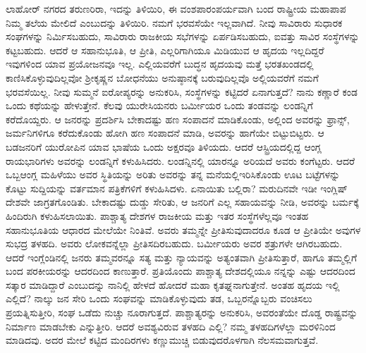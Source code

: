 ಲಾಹೋರ್​ ನಗರದ ತರುಣರಿರಾ, ಇದನ್ನು ತಿಳಿಯಿರಿ, ಈ ವಂಶ\break ಪಾರಂಪರ್ಯವಾಗಿ ಬಂದ ರಾಷ್ಟ್ರೀಯ ಮಹಾಪಾಪ ನಿಮ್ಮ ತಲೆಯ ಮೇಲಿದೆ ಎಂಬುದನ್ನು ತಿಳಿಯಿರಿ. ನಮಗೆ ಭರವಸೆಯೇ ಇಲ್ಲವಾಗಿದೆ. ನೀವು ಸಾವಿರಾರು ಸುಧಾರಕ ಸಂಘಗಳನ್ನು ನಿರ್ಮಿಸಬಹುದು, ಸಾವಿರಾರು ರಾಜಕೀಯ ಸಭೆಗಳನ್ನು ಏರ್ಪಡಿಸಬಹುದು, ಐವತ್ತು ಸಾವಿರ ಸಂಸ್ಥೆಗಳನ್ನು ಕಟ್ಟಬಹುದು. ಆದರೆ ಆ ಸಹಾನುಭೂತಿ, ಆ ಪ್ರೀತಿ, ಎಲ್ಲರಿಗಾಗಿಯೂ ಮಿಡಿಯುವ ಆ ಹೃದಯ ಇಲ್ಲದಿದ್ದರೆ ಇವುಗಳಿಂದ ಯಾವ ಪ್ರಯೋಜನವೂ ಇಲ್ಲ. ಎಲ್ಲಿಯವರೆಗೆ ಬುದ್ಧನ ಹೃದಯವು ಮತ್ತೆ ಭರತಖಂಡದಲ್ಲಿ ಕಾಣಿಸಿಕೊಳ್ಳುವುದಿಲ್ಲವೋ ಶ‍್ರೀಕೃಷ್ಣನ ಬೋಧನೆಯು ಅನುಷ್ಠಾನಕ್ಕೆ ಬರುವುದಿಲ್ಲವೊ ಅಲ್ಲಿಯವರೆಗೆ ನಮಗೆ ಭರವಸೆಯಿಲ್ಲ. ನೀವು ಸುಮ್ಮನೆ ಐರೋಪ್ಯರನ್ನು ಅನುಕರಿಸಿ, ಸಂಸ್ಥೆಗಳನ್ನು ಕಟ್ಟಿದರೆ ಏನಾಗುತ್ತದೆ? ನಾನು ಕಣ್ಣಾರೆ ಕಂಡ ಒಂದು ಕಥೆಯನ್ನು ಹೇಳುತ್ತೇನೆ. ಕೆಲವು ಯುರೇಸಿಯನರು ಬರ್ಮೀಯರ ಒಂದು ತಂಡವನ್ನು ಲಂಡನ್ನಿಗೆ ಕರೆದೊಯ್ದರು. ಆ ಜನರನ್ನು ಪ್ರದರ್ಶಿಸಿ ಬೇಕಾದಷ್ಟು ಹಣ ಸಂಪಾದನೆ ಮಾಡಿಕೊಂಡು, ಅಲ್ಲಿಂದ ಅವರನ್ನು ಫ್ರಾನ್ಸ್, ಜರ್ಮನಿಗಳಿಗೂ ಕರೆದುಕೊಂಡು ಹೋಗಿ ಹಣ ಸಂಪಾದನೆ ಮಾಡಿ, ಅವರನ್ನು ಹಾಗೆಯೇ ಬಿಟ್ಟುಬಿಟ್ಟರು. ಆ ಬಡಜನರಿಗೆ ಯುರೋಪಿನ ಯಾವ ಭಾಷೆಯ ಒಂದು ಅಕ್ಷರವೂ ತಿಳಿಯದು. ಆದರೆ ಆಸ್ಟ್ರಿಯದಲ್ಲಿದ್ದ ಆಂಗ್ಲ ರಾಯಭಾರಿಗಳು ಅವರನ್ನು ಲಂಡನ್ನಿಗೆ ಕಳುಹಿಸಿದರು. ಲಂಡನ್ನಿನಲ್ಲಿ ಯಾರನ್ನೂ ಅರಿಯದೆ ಅವರು ಕಂಗೆಟ್ಟರು. ಆದರೆ ಒಬ್ಬ\break ಆಂಗ್ಲ ಮಹಿಳೆಯು ಅವರ ಸ್ಥಿತಿಯನ್ನು ಅರಿತು ಅವರನ್ನು ತನ್ನ ಮನೆಯಲ್ಲಿ\break ಇರಿಸಿಕೊಂಡು ಊಟ ಬಟ್ಟೆಗಳನ್ನು ಕೊಟ್ಟು ಸುದ್ದಿಯನ್ನು ವರ್ತಮಾನ ಪತ್ರಿಕೆಗಳಿಗೆ ಕಳುಹಿಸಿದಳು. ಏನಾಯಿತು ಬಲ್ಲಿರಾ? ಮರುದಿನವೇ ಇಡೀ ಇಂಗ್ಲಿಷ್​ ದೇಶವೇ ಜಾಗ್ರತಗೊಂಡಿತು. ಬೇಕಾದಷ್ಟು ದುಡ್ಡು ಸೇರಿತು, ಆ ಜನರಿಗೆ ಎಲ್ಲ ಸಹಾಯವನ್ನು ನೀಡಿ, ಅವರನ್ನು ಬರ್ಮಕ್ಕೆ ಹಿಂದಿರುಗಿ ಕಳುಹಿಸಲಾಯಿತು. ಪಾಶ್ಚಾತ್ಯ ದೇಶಗಳ ರಾಜಕೀಯ ಮತ್ತು ಇತರ ಸಂಸ್ಥೆಗಳೆಲ್ಲವೂ ಇಂತಹ ಸಹಾನುಭೂತಿಯ ಆಧಾರದ ಮೇಲೆಯೇ ನಿಂತಿವೆ. ಅವರು ತಮ್ಮನ್ನೇ ಪ್ರೀತಿಸುವು\-ದಾದರೂ ಕೂಡ ಆ ಪ್ರೀತಿಯೇ ಅವುಗಳ ಸುಭದ್ರ ತಳಹದಿ. ಅವರು ಲೋಕವನ್ನೆಲ್ಲಾ ಪ್ರೀತಿಸದಿರಬಹುದು. ಬರ್ಮೀಯರು ಅವರ ಶತ್ರುಗಳೇ ಆಗಿರಬಹುದು. ಆದರೆ ಇಂಗ್ಲೆಂಡಿನಲ್ಲಿ ಜನರು ತಮ್ಮವರನ್ನೂ ಸತ್ಯ ಮತ್ತು ನ್ಯಾಯವನ್ನು ಅತ್ಯಂತವಾಗಿ ಪ್ರೀತಿಸುತ್ತಾರೆ, ಹಾಗೂ ತಮ್ಮಲ್ಲಿಗೆ ಬಂದ ಪರಕೀಯರನ್ನು ಆದರದಿಂದ ಕಾಣುತ್ತಾರೆ. ಪ್ರತಿಯೊಂದು ಪಾಶ್ಚಾತ್ಯ ದೇಶದಲ್ಲಿಯೂ ನನ್ನನ್ನು ಎಷ್ಟು ಆದರದಿಂದ ಸತ್ಕಾರ ಮಾಡಿದ್ದಾರೆ ಎಂಬುದನ್ನು ನಾನಿಲ್ಲಿ ಹೇಳದೆ ಹೋದರೆ ಮಹಾ ಕೃತಘ್ನನಾಗುತ್ತೇನೆ. ಅಂತಹ ಹೃದಯ ಇಲ್ಲಿ ಎಲ್ಲಿದೆ? ನಾಲ್ಕು ಜನ ಸೇರಿ ಒಂದು ಸಂಘವನ್ನು ಮಾಡಿಕೊಳ್ಳುವುದು ತಡ, ಒಬ್ಬರನ್ನೊಬ್ಬರು ವಂಚಿಸಲು ಪ್ರಯತ್ನಿಸುತ್ತೀರಿ, ಸಂಘ ಒಡೆದು ನುಚ್ಚು ನೂರಾಗುತ್ತದೆ. ಪಾಶ್ಚಾತ್ಯರನ್ನು ಅನುಕರಿಸಿ, ಅವರಂತೆಯೇ ದೊಡ್ಡ ರಾಷ್ಟ್ರವನ್ನು ನಿರ್ಮಾಣ ಮಾಡಬೇಕು ಎನ್ನುತ್ತೀರಿ. ಆದರೆ ಅವಶ್ಯವಿರುವ ತಳಹದಿ ಎಲ್ಲಿ? ನಮ್ಮ ತಳಹದಿಗಳೆಲ್ಲಾ ಮರಳಿನಿಂದ ಮಾಡಿದವು. ಅದರ ಮೇಲೆ ಕಟ್ಟಿದ ಮಂದಿರಗಳು ಕಣ್ಣುಮುಚ್ಚಿ ಬಿಡುವುದರೊಳಗಾಗಿ ನೆಲಸಮವಾಗುತ್ತವೆ.

